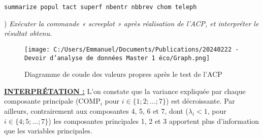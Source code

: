 \begin{lstlisting}[style=Stata]
	summarize popul tact superf nbentr nbbrev chom teleph
\end{lstlisting}

) \textit{Exécuter la commande « screeplot » après réalisation de l’ACP, et interpréter le résultat obtenu.}\\

\begin{figure}[H]
	\centering \texttt{[image: C:/Users/Emmanuel/Documents/Publications/20240222 - Devoir d'analyse de données Master 1 éco/Graph.png]}
	\caption{Diagramme de coude des valeurs propres après le test de l'ACP}
\end{figure}

\noindent \textbf{\underline{INTERPR\'ETATION :}} L'on constate que la variance expliquée par chaque composante principale (COMP$_i$ pour $i\in \{1;2;...;7\}$) est décroissante. Par ailleurs, contrairement aux composantes 4, 5, 6 et 7, dont ($\lambda_i<1$, pour $i\in  \{4;5;...;7\}$) les composantes principales 1, 2 et 3 apportent plus d'information que les variables principales.